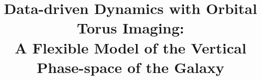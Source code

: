 



\documentclass[modern]{aastex631}

\usepackage{microtype}  %
\usepackage{amsmath}
\usepackage{amsfonts}
\usepackage{amssymb}
\usepackage{booktabs}
\usepackage{graphicx}

\usepackage{enumitem}

\renewcommand{\twocolumngrid}{\onecolumngrid}
\setlength{\parindent}{1.1\baselineskip}
\addtolength{\topmargin}{-0.2in}
\addtolength{\textheight}{0.4in}
\sloppy\sloppypar\raggedbottom\frenchspacing

\graphicspath{{figures/}}


\newcommand{\freqzero}{\ensuremath{\Omega_0}}
\newcommand{\mmax}{\ensuremath{M}}
\newcommand{\rz}{\ensuremath{r_z}}
\newcommand{\rzp}{\ensuremath{\tilde{r}_z}}
\newcommand{\thz}{\ensuremath{\theta_z}}
\newcommand{\thzp}{\ensuremath{\tilde{\theta}_z}}

\shorttitle{}



\title{
    Data-driven Dynamics with Orbital Torus Imaging:  \\
    A Flexible Model of the Vertical Phase-space of the Galaxy
}

